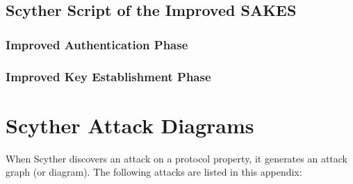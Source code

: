 \section{Scyther Script of the Improved SAKES}

\subsection{Improved Authentication Phase}
\label{app:sakes-fixed-auth}


\subsection{Improved Key Establishment Phase}
\label{app:sakes-fixed-keys}


\chapter{Scyther Attack Diagrams}
\label{app:attacks}

When Scyther discovers an attack on a protocol property, it generates an attack graph (or diagram). The following attacks are listed in this appendix:

